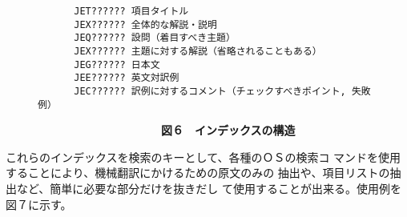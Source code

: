 \begin{figure}
\begin{small}
\begin{verbatim}
　　   JET?????? 項目タイトル
　　   JEX?????? 全体的な解説・説明
　　   JEQ?????? 設問（着目すべき主題）
　　   JEX?????? 主題に対する解説（省略されることもある）
　　   JEG?????? 日本文
　　   JEE?????? 英文対訳例
　　   JEC?????? 訳例に対するコメント（チェックすべきポイント, 失敗例）
\end{verbatim}
\end{small}
{\bf　　　　　　　　　　　図６　インデックスの構造}\\

\end{figure}


これらのインデックスを検索のキーとして、各種のＯＳの検索コ
マンドを使用することにより、機械翻訳にかけるための原文のみの
抽出や、項目リストの抽出など、簡単に必要な部分だけを抜きだし
て使用することが出来る。使用例を図７に示す。

